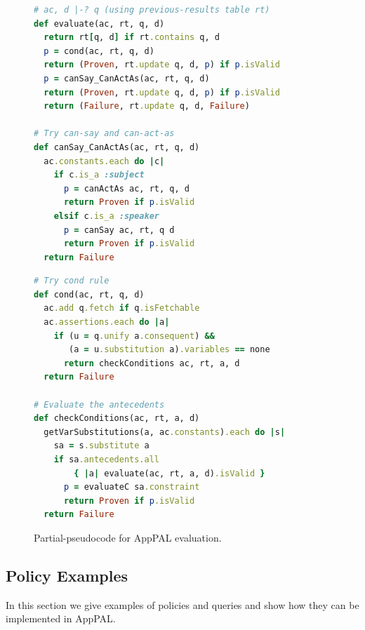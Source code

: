 \documentclass[a4paper]{scrartcl}
\begin{document}
\begin{figure}
\begin{minipage}[b]{0.5\linewidth}
\begin{lstlisting}[language=Ruby, basicstyle=\ttfamily\scriptsize, keywordstyle=\scriptsize\slshape, columns=flexible]
# ac, d |-? q (using previous-results table rt)
def evaluate(ac, rt, q, d)
  return rt[q, d] if rt.contains q, d
  p = cond(ac, rt, q, d)
  return (Proven, rt.update q, d, p) if p.isValid 
  p = canSay_CanActAs(ac, rt, q, d)
  return (Proven, rt.update q, d, p) if p.isValid 
  return (Failure, rt.update q, d, Failure)

# Try can-say and can-act-as
def canSay_CanActAs(ac, rt, q, d)
  ac.constants.each do |c| 
    if c.is_a :subject
      p = canActAs ac, rt, q, d
      return Proven if p.isValid
    elsif c.is_a :speaker
      p = canSay ac, rt, q d
      return Proven if p.isValid
  return Failure
\end{lstlisting}
\end{minipage}
\begin{minipage}[b]{0.5\linewidth}
\begin{lstlisting}[language=Ruby, basicstyle=\ttfamily\scriptsize, keywordstyle=\scriptsize\slshape, columns=flexible]
# Try cond rule
def cond(ac, rt, q, d)
  ac.add q.fetch if q.isFetchable
  ac.assertions.each do |a|
    if (u = q.unify a.consequent) &&
       (a = u.substitution a).variables == none
      return checkConditions ac, rt, a, d
  return Failure
    
# Evaluate the antecedents
def checkConditions(ac, rt, a, d)
  getVarSubstitutions(a, ac.constants).each do |s|
    sa = s.substitute a
    if sa.antecedents.all 
        { |a| evaluate(ac, rt, a, d).isValid }
      p = evaluateC sa.constraint
      return Proven if p.isValid
  return Failure
\end{lstlisting}
\end{minipage}
\caption{Partial-pseudocode for AppPAL evaluation.}
\label{fig:pseudocode}
\end{figure}

\subsection{Policy Examples}
\label{ssec:idioms}

In this section we give examples of policies and queries and show how they can be implemented in AppPAL.
\end{document}
